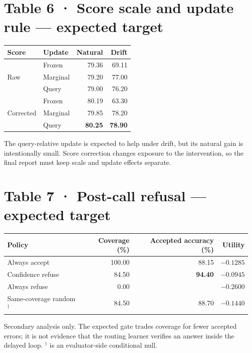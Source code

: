 \documentclass[10pt]{article}
\newcommand{\notrun}{\textemdash}
\newcommand{\targetcell}[1]{\textbf{#1}}
\newcommand{\smallnote}[1]{{\footnotesize\color{Gray}#1}}
\begin{document}
\section*{Table 6 · Score scale and update rule — expected target}
\begin{tabularx}{\linewidth}{@{}llrr@{}}
\toprule
Score & Update & Natural & Drift \\
\midrule
\multirow{3}{*}{Raw} & Frozen & 79.36 & 69.11 \\
& Marginal & 79.20 & 77.00 \\
& Query & 79.00 & 76.20 \\
\midrule
\multirow{3}{*}{Corrected} & Frozen & 80.19 & 63.30 \\
& Marginal & 79.85 & 78.20 \\
& Query & \targetcell{80.25} & \targetcell{78.90} \\
\bottomrule
\end{tabularx}
\smallnote{The query-relative update is expected to help under drift, but its natural gain is intentionally small. Score correction changes exposure to the intervention, so the final report must keep scale and update effects separate.}

\section*{Table 7 · Post-call refusal — expected target}
\begin{tabularx}{\linewidth}{@{}lrrr@{}}
\toprule
Policy & Coverage (\%) & Accepted accuracy (\%) & Utility \\
\midrule
Always accept & 100.00 & 88.15 & $-0.1285$ \\
Confidence refuse & 84.50 & \targetcell{94.40} & \targetcell{$-0.0945$} \\
Always refuse & 0.00 & \notrun & $-0.2600$ \\
\midrule
Same-coverage random$^{\dagger}$ & 84.50 & 88.70 & $-0.1440$ \\
\bottomrule
\end{tabularx}
\smallnote{Secondary analysis only. The expected gate trades coverage for fewer accepted errors; it is not evidence that the routing learner verifies an answer inside the delayed loop. $^{\dagger}$ is an evaluator-side conditional null.}

\clearpage
\end{document}
